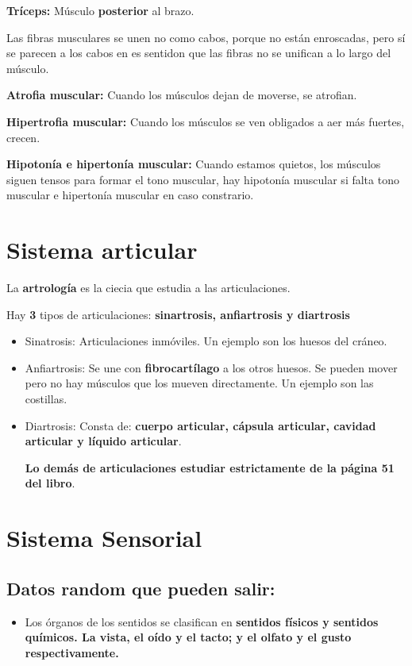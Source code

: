 \documentclass{article}
\begin{document}
  \textbf{Tríceps: } Músculo \textbf{posterior} al brazo.

  Las fibras musculares se unen no como cabos, porque no están enroscadas, pero sí se parecen a 
  los cabos en es sentidon que las fibras no se unifican a lo largo del músculo.

  \textbf{Atrofia muscular:} Cuando los músculos dejan de moverse, se atrofian.

  \textbf{Hipertrofia muscular:} Cuando los músculos se ven obligados a aer más fuertes, crecen.
  
  \textbf{Hipotonía e hipertonía muscular:} Cuando estamos quietos, los músculos siguen 
  tensos para formar el tono muscular, hay hipotonía muscular si falta tono muscular
  e hipertonía muscular en caso constrario.

\section{Sistema articular}
La \textbf{artrología} es la ciecia que estudia a las articulaciones.

Hay \textbf{3} tipos de articulaciones: \textbf{sinartrosis, anfiartrosis y diartrosis}

\begin{itemize}
  \item Sinatrosis: Articulaciones inmóviles. Un ejemplo son los huesos del cráneo.
  \item Anfiartrosis: Se une con \textbf{fibrocartílago} a los otros huesos. Se pueden mover pero no hay músculos que los mueven directamente. Un ejemplo son las costillas.
  \item Diartrosis: Consta de: \textbf{cuerpo articular, cápsula articular, cavidad articular y líquido articular}. 

    \textbf{Lo demás de articulaciones estudiar estrictamente de la página 51 del libro}.
\end{itemize}

\section{Sistema Sensorial}
\subsection{Datos random que pueden salir:}
\begin{itemize}
\item Los órganos de los sentidos se clasifican en \textbf{sentidos
  físicos y sentidos químicos. La vista, el oído y el tacto;
y el olfato y el gusto respectivamente.}
\end{itemize}
\end{document}
